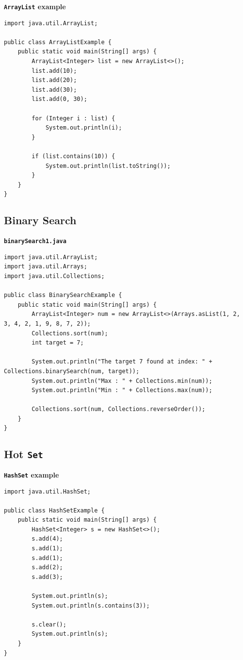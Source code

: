 \documentclass{book}
\begin{document}
\textbf{\texttt{ArrayList} example}

\begin{verbatim}
import java.util.ArrayList;

public class ArrayListExample {
    public static void main(String[] args) {
        ArrayList<Integer> list = new ArrayList<>();
        list.add(10);
        list.add(20);
        list.add(30);
        list.add(0, 30);

        for (Integer i : list) {
            System.out.println(i);
        }

        if (list.contains(10)) {
            System.out.println(list.toString());
        }
    }
}
\end{verbatim}

\subsection{Binary Search}

\textbf{\texttt{binarySearch1.java}}

\begin{verbatim}
import java.util.ArrayList;
import java.util.Arrays;
import java.util.Collections;

public class BinarySearchExample {
    public static void main(String[] args) {
        ArrayList<Integer> num = new ArrayList<>(Arrays.asList(1, 2, 3, 4, 2, 1, 9, 8, 7, 2));
        Collections.sort(num);
        int target = 7;

        System.out.println("The target 7 found at index: " + Collections.binarySearch(num, target));
        System.out.println("Max : " + Collections.min(num));
        System.out.println("Min : " + Collections.max(num));

        Collections.sort(num, Collections.reverseOrder());
    }
}
\end{verbatim}

\subsection{Hot \texttt{Set}}

\textbf{\texttt{HashSet} example}

\begin{verbatim}
import java.util.HashSet;

public class HashSetExample {
    public static void main(String[] args) {
        HashSet<Integer> s = new HashSet<>();
        s.add(4);
        s.add(1);
        s.add(1);
        s.add(2);
        s.add(3);

        System.out.println(s);
        System.out.println(s.contains(3));

        s.clear();
        System.out.println(s);
    }
}
\end{verbatim}
\end{document}
